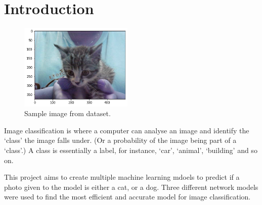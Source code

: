 \section{Introduction}


\begin{figure}
    \centering
    \includegraphics[width=0.48\textwidth]{Images/cat_1.png}
    \caption{Sample image from dataset.}
    \label{fig:sample-dataset}
\end{figure}

Image classification is where a computer can analyse an image and identify the ‘class’ the image falls under. (Or a probability of the image being part of a ‘class’.) A class is essentially a label, for instance, ‘car’, ‘animal’, ‘building’ and so on. 

This project aims to create multiple machine learning mdoels to predict if a photo given to the model is either a cat, or a dog. Three different network models were used to find the most efficient and accurate model for image classification.

